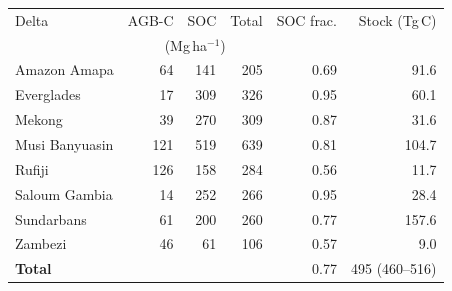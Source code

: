\begin{tabular}{lrrrrr}
\toprule
Delta & AGB-C & SOC & Total & SOC frac. & Stock (Tg\,C) \\
 & \multicolumn{3}{c}{(Mg\,ha$^{-1}$)} & & \\
\midrule
Amazon Amapa & 64 & 141 & 205 & 0.69 & 91.6 \\
Everglades & 17 & 309 & 326 & 0.95 & 60.1 \\
Mekong & 39 & 270 & 309 & 0.87 & 31.6 \\
Musi Banyuasin & 121 & 519 & 639 & 0.81 & 104.7 \\
Rufiji & 126 & 158 & 284 & 0.56 & 11.7 \\
Saloum Gambia & 14 & 252 & 266 & 0.95 & 28.4 \\
Sundarbans & 61 & 200 & 260 & 0.77 & 157.6 \\
Zambezi & 46 & 61 & 106 & 0.57 & 9.0 \\
\midrule
\textbf{Total} & & & & 0.77 & 495 (460--516) \\
\bottomrule
\end{tabular}
